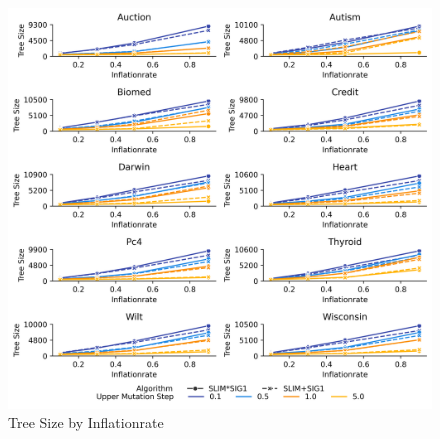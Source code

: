 
    \begin{figure}[H]
    \centering
    \includegraphics[width=\linewidth]{../Latex/Chapters/Figures/Results/RQ_Inflationrate_tree_size_by_p_inflate.png}
    \caption{Tree Size by Inflationrate}
    \label{fig:RQ_Inflationrate_tree_size_by_p_inflate}
    \end{figure}
    